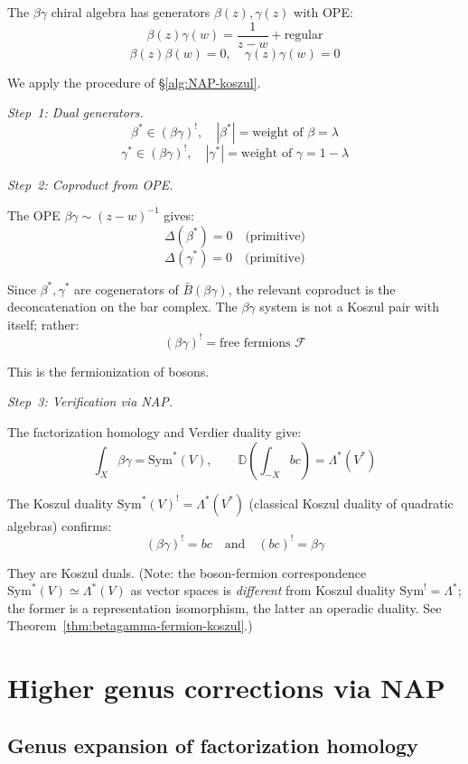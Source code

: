 \begin{computation}\label{comp:betagamma-dual}
The $\beta\gamma$ chiral algebra has generators $\beta(z), \gamma(z)$ with OPE:
\[\beta(z) \gamma(w) = \frac{1}{z-w} + \text{regular}\]
\[\beta(z) \beta(w) = 0, \quad \gamma(z) \gamma(w) = 0\]

We apply the procedure of \S\ref{alg:NAP-koszul}.

\emph{Step~1: Dual generators.}
\[\beta^* \in (\beta\gamma)^!, \quad |\beta^*| = \text{weight of } \beta = \lambda\]
\[\gamma^* \in (\beta\gamma)^!, \quad |\gamma^*| = \text{weight of } \gamma = 1-\lambda\]

\emph{Step~2: Coproduct from OPE.}

The OPE $\beta \gamma \sim (z-w)^{-1}$ gives:
\[\Delta(\beta^*) = 0 \quad \text{(primitive)}\]
\[\Delta(\gamma^*) = 0 \quad \text{(primitive)}\]

Since $\beta^*, \gamma^*$ are cogenerators of $\bar{B}(\beta\gamma)$, the relevant coproduct is the deconcatenation on the bar complex. The $\beta\gamma$ system is not a Koszul pair with itself; rather:
\[(\beta\gamma)^! = \text{free fermions } \mathcal{F}\]

This is the fermionization of bosons.

\emph{Step~3: Verification via NAP.}

The factorization homology and Verdier duality give:
\[\int_X \beta\gamma = \mathrm{Sym}^*(V), \qquad \mathbb{D}\!\left(\int_{-X} bc\right) = \Lambda^*(V^*)\]

The Koszul duality $\mathrm{Sym}^*(V)^! = \Lambda^*(V^*)$ (classical Koszul duality of quadratic algebras) confirms:
\[(\beta\gamma)^! = bc \quad \text{and} \quad (bc)^! = \beta\gamma\]

They are Koszul duals.  (Note: the boson-fermion correspondence $\mathrm{Sym}^*(V) \simeq \Lambda^*(V)$ as vector spaces is \emph{different} from Koszul duality $\mathrm{Sym}^! = \Lambda^*$; the former is a representation isomorphism, the latter an operadic duality.  See Theorem~\ref{thm:betagamma-fermion-koszul}.)
\end{computation}

\section{Higher genus corrections via NAP}

\subsection{Genus expansion of factorization homology}


